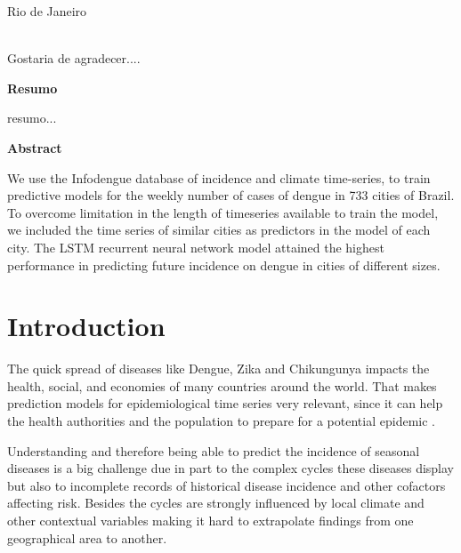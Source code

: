 \documentclass[12pt]{report}
\begin{document}
\par
\vfill
\begin{center}
{{\normalsize Rio de Janeiro}\\
{\normalsize \the\year}}
\end{center}

\thispagestyle{empty}

\newpage
{}\\
\doublespacing
Gostaria de agradecer....

\thispagestyle{empty}

\newpage
\begin{center}
\textbf{\normalsize Resumo}
\end{center}
\vspace{1pt}

resumo...

\thispagestyle{empty}

\newpage
\begin{center}
\textbf{\normalsize Abstract}
\end{center}
\vspace{1pt}

We use the Infodengue database of incidence and climate time-series, to train predictive models for the weekly number of cases of dengue in 733 cities of Brazil. To overcome limitation in the length of timeseries available to train the model, we included the time series of similar cities as predictors in the model of each city. The LSTM recurrent neural network model attained the highest performance in predicting future incidence on dengue in cities of different sizes. 

\thispagestyle{empty}

\newpage
\tableofcontents
\listoffigures
\thispagestyle{empty}

\newpage
\chapter{Introduction}


The quick spread of diseases like Dengue, Zika and Chikungunya impacts the health, social, and economies of many countries around the world. That makes prediction models for epidemiological time series very relevant, since it can help the health authorities and the population to prepare for a potential epidemic \citep{luz2008time}. 


Understanding and therefore being able to predict the incidence of seasonal diseases is a big challenge due in part to the complex cycles these diseases display but also to  incomplete records of historical disease incidence and other cofactors affecting risk. Besides the cycles are strongly influenced by local climate  and other contextual variables making it hard to extrapolate findings from one geographical area to another.
\end{document}
